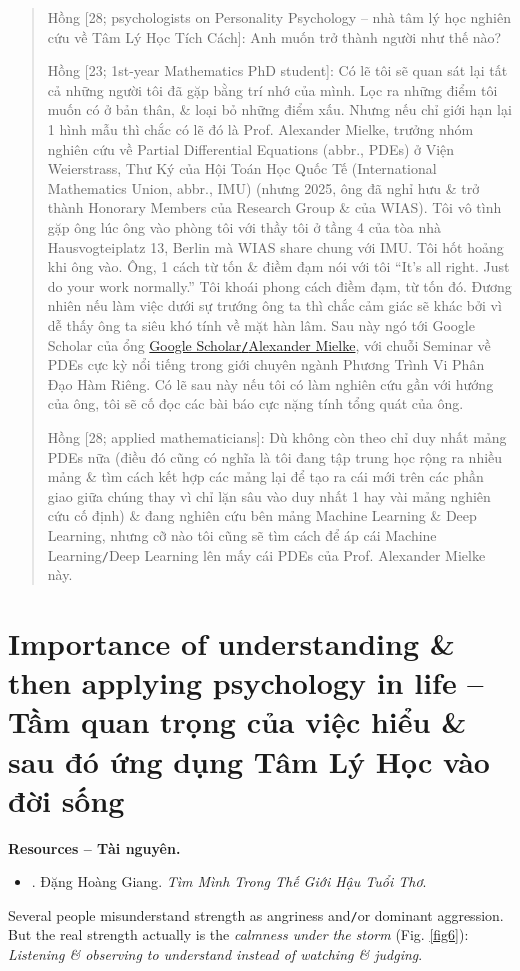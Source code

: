 \documentclass[12pt,twoside]{book}
\begin{document}
\begin{quote}
	{\sf Hồng [28; psychologists on Personality Psychology -- nhà tâm lý học nghiên cứu về Tâm Lý Học Tích Cách]}: Anh muốn trở thành người như thế nào?
	
	{\sf Hồng [23; 1st-year Mathematics PhD student]}: Có lẽ tôi sẽ quan sát lại tất cả những người tôi đã gặp bằng trí nhớ của mình. Lọc ra những điểm tôi muốn có ở bản thân, \& loại bỏ những điểm xấu. Nhưng nếu chỉ giới hạn lại 1 hình mẫu thì chắc có lẽ đó là Prof. {\sc Alexander Mielke}, trưởng nhóm nghiên cứu về Partial Differential Equations (abbr., PDEs) ở Viện Weierstrass, Thư Ký của Hội Toán Học Quốc Tế (International Mathematics Union, abbr., IMU) (nhưng 2025, ông đã nghỉ hưu \& trở thành Honorary Members của Research Group \& của WIAS). Tôi vô tình gặp ông lúc ông vào phòng tôi với thầy tôi ở tầng 4 của tòa nhà Hausvogteiplatz 13, Berlin mà WIAS share chung với IMU. Tôi hốt hoảng khi ông vào. Ông, 1 cách từ tốn \& điềm đạm nói với tôi ``It's all right. Just do your work normally.'' Tôi khoái phong cách điềm đạm, từ tốn đó. Đương nhiên nếu làm việc dưới sự trướng ông ta thì chắc cảm giác sẽ khác bởi vì dễ thấy ông ta siêu khó tính về mặt hàn lâm. Sau này ngó tới Google Scholar của ổng \href{https://scholar.google.com/citations?hl=en&user=G0GqC2sAAAAJ&view_op=list_works}{Google Scholar{\tt/}{\sc Alexander Mielke}}, với chuỗi Seminar về PDEs cực kỳ nổi tiếng trong giới chuyên ngành Phương Trình Vi Phân Đạo Hàm Riêng. Có lẽ sau này nếu tôi có làm nghiên cứu gần với hướng của ông, tôi sẽ cố đọc các bài báo cực nặng tính tổng quát của ông.
	
	{\sf Hồng [28; applied mathematicians]}: Dù không còn theo chỉ duy nhất mảng PDEs nữa (điều đó cũng có nghĩa là tôi đang tập trung học rộng ra nhiều mảng \& tìm cách kết hợp các mảng lại để tạo ra cái mới trên các phần giao giữa chúng thay vì chỉ lặn sâu vào duy nhất 1 hay vài mảng nghiên cứu cố định) \& đang nghiên cứu bên mảng Machine Learning \& Deep Learning, nhưng cỡ nào tôi cũng sẽ tìm cách để áp cái Machine Learning{\tt/}Deep Learning lên mấy cái PDEs của Prof. {\sc Alexander Mielke} này.
\end{quote}

\section{Importance of understanding \& then applying psychology in life -- Tầm quan trọng của việc hiểu \& sau đó ứng dụng Tâm Lý Học vào đời sống}
\textbf{\textsf{Resources -- Tài nguyên.}}
\begin{itemize}
	\item \cite{Giang_after_childhood}. {\sc Đặng Hoàng Giang}. {\it Tìm Mình Trong Thế Giới Hậu Tuổi Thơ}.
\end{itemize}
Several people misunderstand strength as angriness and{\tt/}or dominant aggression. But the real strength actually is the {\it calmness under the storm} (Fig. \ref{fig6}): {\it Listening \& observing to understand instead of watching \& judging}.
\end{document}
